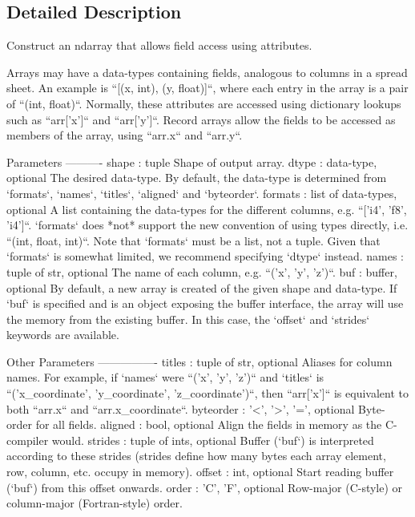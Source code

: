 \subsection{Detailed Description}
\begin{DoxyVerb}Construct an ndarray that allows field access using attributes.

Arrays may have a data-types containing fields, analogous
to columns in a spread sheet.  An example is ``[(x, int), (y, float)]``,
where each entry in the array is a pair of ``(int, float)``.  Normally,
these attributes are accessed using dictionary lookups such as ``arr['x']``
and ``arr['y']``.  Record arrays allow the fields to be accessed as members
of the array, using ``arr.x`` and ``arr.y``.

Parameters
----------
shape : tuple
    Shape of output array.
dtype : data-type, optional
    The desired data-type.  By default, the data-type is determined
    from `formats`, `names`, `titles`, `aligned` and `byteorder`.
formats : list of data-types, optional
    A list containing the data-types for the different columns, e.g.
    ``['i4', 'f8', 'i4']``.  `formats` does *not* support the new
    convention of using types directly, i.e. ``(int, float, int)``.
    Note that `formats` must be a list, not a tuple.
    Given that `formats` is somewhat limited, we recommend specifying
    `dtype` instead.
names : tuple of str, optional
    The name of each column, e.g. ``('x', 'y', 'z')``.
buf : buffer, optional
    By default, a new array is created of the given shape and data-type.
    If `buf` is specified and is an object exposing the buffer interface,
    the array will use the memory from the existing buffer.  In this case,
    the `offset` and `strides` keywords are available.

Other Parameters
----------------
titles : tuple of str, optional
    Aliases for column names.  For example, if `names` were
    ``('x', 'y', 'z')`` and `titles` is
    ``('x_coordinate', 'y_coordinate', 'z_coordinate')``, then
    ``arr['x']`` is equivalent to both ``arr.x`` and ``arr.x_coordinate``.
byteorder : {'<', '>', '='}, optional
    Byte-order for all fields.
aligned : bool, optional
    Align the fields in memory as the C-compiler would.
strides : tuple of ints, optional
    Buffer (`buf`) is interpreted according to these strides (strides
    define how many bytes each array element, row, column, etc.
    occupy in memory).
offset : int, optional
    Start reading buffer (`buf`) from this offset onwards.
order : {'C', 'F'}, optional
    Row-major (C-style) or column-major (Fortran-style) order.


\end{DoxyVerb}
